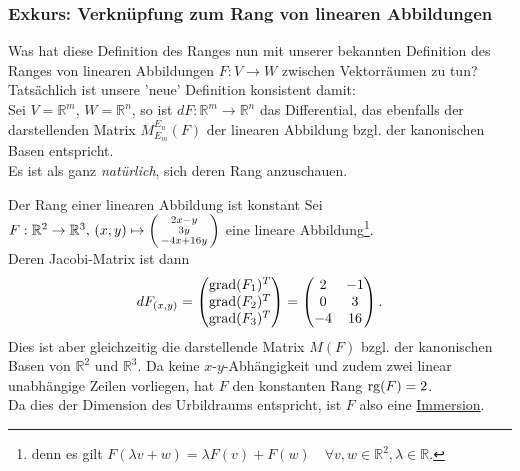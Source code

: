 \subsubsection{Exkurs: Verknüpfung zum Rang von linearen Abbildungen}
Was hat diese Definition des Ranges nun mit unserer bekannten Definition des Ranges von linearen Abbildungen $F:V\to W$ zwischen Vektorräumen zu tun?\\
Tatsächlich ist unsere 'neue' Definition konsistent damit:\\
Sei $V=\mathbb{R}^m$, $W=\mathbb{R}^n$, so ist $dF:\mathbb{R}^m\to\mathbb{R}^n$ das Differential, das ebenfalls der darstellenden Matrix $M_{E_m}^{E_n}(F)$ der linearen Abbildung bzgl. der kanonischen Basen entspricht.\\
Es ist als ganz \textit{natürlich}, sich deren Rang anzuschauen.
\begin{Beispiel}{Der Rang einer linearen Abbildung ist konstant}
Sei $F:\mathbb{R}^2\to\mathbb{R}^3,\, (x,y)\mapsto\left(\begin{smallmatrix}2x-y\\3y\\-4x+16y\end{smallmatrix}\right)$ eine lineare Abbildung\footnote{denn es gilt $F(\lambda v+w)=\lambda F(v)+F(w)\quad \forall v, w\in\mathbb{R}^2,\lambda\in\mathbb{R}$.}.\\
Deren Jacobi-Matrix ist dann
\begin{equation*}
    dF_{(x,y)}=\begin{pmatrix}\text{grad}(F_1)^T\\\text{grad}(F_2)^T\\\text{grad}(F_3)^T\end{pmatrix}=\begin{pmatrix}2&-1\\0&3\\-4&16\end{pmatrix}.
\end{equation*}
Dies ist aber gleichzeitig die darstellende Matrix $M(F)$ bzgl. der kanonischen Basen von $\mathbb{R}^2$ und $\mathbb{R}^3$. Da keine $x$-$y$-Abhängigkeit und zudem zwei linear unabhängige Zeilen vorliegen, hat $F$ den konstanten Rang $\text{rg}(F)=2$.\\
Da dies der Dimension des Urbildraums entspricht, ist $F$ also eine \underline{Immersion}.
\end{Beispiel}


